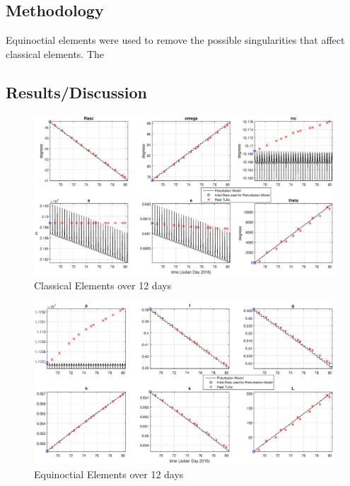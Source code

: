 \documentclass[Space3_Assign1.tex]{subfiles}
\begin{document}
\subsection{Methodology}
Equinoctial elements were used to remove the possible singularities that affect classical elements. The 



\subsection{Results/Discussion}
\begin{figure}[h]
\centering
\caption{Classical Elements over 12 days}
\label{fig:Q2classical_overtime}
\includegraphics[trim = {4cm 0 3cm 0},clip,width=1\linewidth]{Q2classical_overtime.eps}
\end{figure}
\begin{figure}[h]
\centering
\caption{Equinoctial Elements over 12 days}
\label{fig:Q2equinoctial_overtime}
\includegraphics[trim = {4cm 0 3cm 0},clip,width=1\linewidth]{Q2equinoctial_overtime.eps}
\end{figure}
\end{document}

